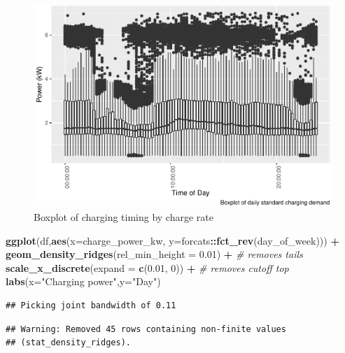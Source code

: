 \documentclass[]{article}
\newenvironment{Shaded}{\begin{snugshade}}{\end{snugshade}}
\newcommand{\KeywordTok}[1]{\textcolor[rgb]{0.13,0.29,0.53}{\textbf{#1}}}
\newcommand{\DataTypeTok}[1]{\textcolor[rgb]{0.13,0.29,0.53}{#1}}
\newcommand{\DecValTok}[1]{\textcolor[rgb]{0.00,0.00,0.81}{#1}}
\newcommand{\FloatTok}[1]{\textcolor[rgb]{0.00,0.00,0.81}{#1}}
\newcommand{\StringTok}[1]{\textcolor[rgb]{0.31,0.60,0.02}{#1}}
\newcommand{\CommentTok}[1]{\textcolor[rgb]{0.56,0.35,0.01}{\textit{#1}}}
\newcommand{\OperatorTok}[1]{\textcolor[rgb]{0.81,0.36,0.00}{\textbf{#1}}}
\newcommand{\NormalTok}[1]{#1}
\begin{document}
\begin{figure}
\centering
\includegraphics{EVBB_SummaryReport_files/figure-latex/boxplotCharging-1.pdf}
\caption{\label{fig:boxplotCharging}Boxplot of charging timing by charge
rate}
\end{figure}

\begin{Shaded}
\begin{Highlighting}[]
\KeywordTok{ggplot}\NormalTok{(df,}\KeywordTok{aes}\NormalTok{(}\DataTypeTok{x=}\NormalTok{charge_power_kw, }\DataTypeTok{y=}\NormalTok{forcats}\OperatorTok{::}\KeywordTok{fct_rev}\NormalTok{(day_of_week))) }\OperatorTok{+}
\StringTok{  }\KeywordTok{geom_density_ridges}\NormalTok{(}\DataTypeTok{rel_min_height =} \FloatTok{0.01}\NormalTok{) }\OperatorTok{+}\StringTok{        }\CommentTok{# removes tails}
\StringTok{  }\KeywordTok{scale_x_discrete}\NormalTok{(}\DataTypeTok{expand =} \KeywordTok{c}\NormalTok{(}\FloatTok{0.01}\NormalTok{, }\DecValTok{0}\NormalTok{)) }\OperatorTok{+}\StringTok{  }\CommentTok{# removes cutoff top}
\StringTok{  }\KeywordTok{labs}\NormalTok{(}\DataTypeTok{x=}\StringTok{"Charging power"}\NormalTok{,}\DataTypeTok{y=}\StringTok{"Day"}\NormalTok{)}
\end{Highlighting}
\end{Shaded}

\begin{verbatim}
## Picking joint bandwidth of 0.11
\end{verbatim}

\begin{verbatim}
## Warning: Removed 45 rows containing non-finite values
## (stat_density_ridges).
\end{verbatim}
\end{document}
